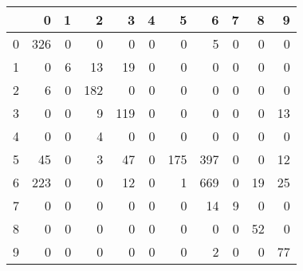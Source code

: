 \begin{tabular}{lrrrrrrrrrr}
\toprule
{} &    0 &  1 &    2 &    3 &  4 &    5 &    6 &  7 &   8 &   9 \\
\midrule
0 &  326 &  0 &    0 &    0 &  0 &    0 &    5 &  0 &   0 &   0 \\
1 &    0 &  6 &   13 &   19 &  0 &    0 &    0 &  0 &   0 &   0 \\
2 &    6 &  0 &  182 &    0 &  0 &    0 &    0 &  0 &   0 &   0 \\
3 &    0 &  0 &    9 &  119 &  0 &    0 &    0 &  0 &   0 &  13 \\
4 &    0 &  0 &    4 &    0 &  0 &    0 &    0 &  0 &   0 &   0 \\
5 &   45 &  0 &    3 &   47 &  0 &  175 &  397 &  0 &   0 &  12 \\
6 &  223 &  0 &    0 &   12 &  0 &    1 &  669 &  0 &  19 &  25 \\
7 &    0 &  0 &    0 &    0 &  0 &    0 &   14 &  9 &   0 &   0 \\
8 &    0 &  0 &    0 &    0 &  0 &    0 &    0 &  0 &  52 &   0 \\
9 &    0 &  0 &    0 &    0 &  0 &    0 &    2 &  0 &   0 &  77 \\
\bottomrule
\end{tabular}
